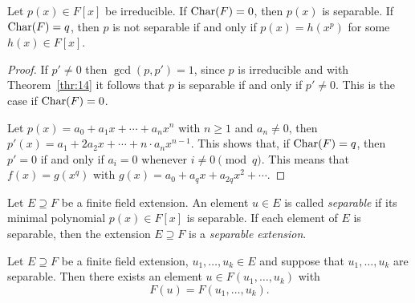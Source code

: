\begin{theorem}
  \label{thr:15}
  Let $p(x) ∈ F[x]$ be irreducible. If $\mathrm{Char}(F) = 0$, then $p(x)$ is separable. If $\mathrm{Char}(F) = q$, then $p$ is not separable if and only if $p(x) = h(x^p)$ for some $h(x) ∈ F[x]$. 
\end{theorem}

\begin{proof}
  If $p' ≠0$ then $\gcd(p,p')=1$, since $p$ is irreducible and with
  Theorem~\ref{thr:14} it follows that
  $p$ is separable if and only if $p'≠0$. 
   This is
  the case if $\mathrm{Char}(F) = 0$.
  
  Let $p(x) = a_0 + a_1x + \cdots + a_n x^n$ with $n≥1$ and $a_n ≠0$,
  then $p'(x) = a_1 + 2a_2x + \cdots + n ⋅ a_n x^{n-1}$. This shows that, if  $\mathrm{Char}(F) =q$, then $p'=0$ if and only if $a_i = 0$ whenever $i ≠ 0 \pmod{q}$. This means that $f(x) = g(x^q)$ with $g(x) = a_0 + a_qx + a_{2q}x^{2} + \cdots$. 
  
\end{proof}

\begin{definition}
  Let $E ⊇F$ be a finite field extension. An element $u ∈E$ is called \emph{separable} if its minimal polynomial $p(x) ∈F[x]$ is separable. If each element of $E$ is separable, then the extension $E⊇F$ is a \emph{separable extension}. 
\end{definition}


\begin{theorem}
  \label{thr:16}
  Let $E ⊇ F$ be a finite field extension, $u_1,\dots,u_k ∈E$ and suppose that $u_1,\dots,u_k$ are separable. Then there exists an element $u ∈ F(u_1,\dots,u_k)$ with
  \begin{displaymath}
    F(u) =  F(u_1,\dots,u_k). 
  \end{displaymath}  
\end{theorem}


